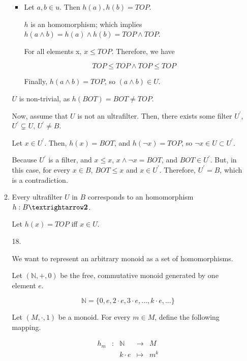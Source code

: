 \documentclass{article}
\begin{document}
\begin{enumerate}
\begin{enumerate}
\begin{itemize}
         \item

           Let $a, b ∈ u$. Then $h(a), h(b) = TOP$.

           $h$ is an homomorphism; which implies $h(a ∧ b) = h(a) ∧ h(b) = TOP ∧ TOP$.

           For all elements x, $x ≤ TOP$. Therefore, we have

           $$TOP ≤ TOP ∧ TOP ≤ TOP$$

           Finally, $h(a ∧ b) = TOP$, so $(a ∧ b) ∈ U$.

      \end{itemize}

      $U$ is non-trivial, as $h(BOT) = BOT ≠ TOP$.

      Now, assume that $U$ is not an ultrafilter. Then, there exists
      some filter $U^\prime$, $U^\prime \subsetneq U$, $U^\prime ≠ B$.
           
      Let $x ∈ U^\prime$. Then, $h(x) = BOT$, and
      $h(¬x) = TOP$, so $¬x ∈ U \subset U^\prime$.

      Because $U^\prime$ is a filter, and $x ≤ x$, $x ∧ ¬x = BOT$, and
      $BOT ∈ U^\prime$. But, in this case, for every $x ∈ B$, $BOT ≤ x$
      and $x ∈ U^\prime$. Therefore, $U^\prime = B$, which is a contradiction.

   \item Every ultrafilter $U$ in $B$ corresponds to an homomorphism $h : B → \text{\bf 2}$.
     
     Let $h(x) = TOP$ iff $x ∈ U$.

     
      

  \item[18.]

    We want to represent an arbitrary monoid as a set of homomorphisms.
    
    Let $(\mathbb{N}, +, 0)$ be the free, commutative monoid generated
    by one element $e$.

    $$\mathbb{N} = \{ 0, e, 2·e, 3·e, …, k·e, … \}$$


    Let $(M,·,1)$ be a monoid. For every $m \in M$, define the
    following mapping.

    \begin{align*}
    h_m & : & \mathbb{N} & →        & M   \\
        &   &     k·e    & \mapsto  & m^k \\
    \end{align*}


\end{enumerate}
\end{enumerate}
\end{document}

